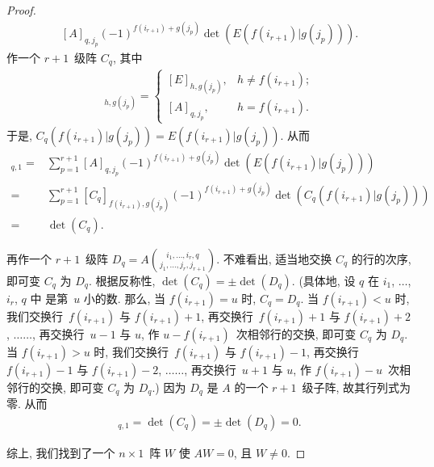 \begin{proof}
\begin{align*}
        {[A]_{q,j_p}
        (-1)^{f(i_{r+1})+g(j_p)}
        \det {(E(f(i_{r+1})|g(j_p)))}}.
    \end{align*}
    作一个 \(r+1\)~级阵 \(C_q\), 其中
    \begin{align*}
        [C_q]_{h,g(j_p)}
        = \begin{cases}
              [E]_{h,g(j_p)},
               & h \neq f(i_{r+1}); \\
              [A]_{q,j_p},
               & h = f(i_{r+1}).
          \end{cases}
    \end{align*}
    于是, \(C_q(f(i_{r+1})|g(j_p))
    = E(f(i_{r+1})|g(j_p))\).
    从而
    \begin{align*}
        [AW]_{q,1}
        = {} &
        \sum_{p=1}^{r+1}
        {[A]_{q,j_p}
        (-1)^{f(i_{r+1})+g(j_p)}
        \det {(E(f(i_{r+1})|g(j_p)))}}
        \\
        = {} &
        \sum_{p=1}^{r+1}
        {[C_q]_{f(i_{r+1}),g(j_p)}
        (-1)^{f(i_{r+1})+g(j_p)}
        \det {(C_q (f(i_{r+1})|g(j_p)))}}
        \\
        = {} &
        \det {(C_q)}.
    \end{align*}

    再作一个 \(r+1\)~级阵
    \(
    \displaystyle
    D_q =
    A\binom{i_1,\dots,i_r,q}
    {j_1,\dots,j_r,j_{r+1}}
    \).
    不难看出, 适当地交换 \(C_q\) 的行的次序,
    即可变 \(C_q\) 为 \(D_q\).
    根据反称性,
    \(\det {(C_q)} = \pm \det {(D_q)}\).
    (具体地, 设 \(q\) 在
    \(i_1\), \(\dots\), \(i_r\), \(q\) 中%
    是第~\(u\) 小的数.
    那么, 当 \(f(i_{r+1}) = u\) 时, \(C_q = D_q\).
    当 \(f(i_{r+1}) < u\) 时,
    我们交换行~\(f(i_{r+1})\) 与 \(f(i_{r+1})+1\),
    再交换行~\(f(i_{r+1})+1\) 与 \(f(i_{r+1})+2\),
    \(\dots \dots\),
    再交换行~\(u-1\) 与 \(u\),
    作 \(u - f(i_{r+1})\)~次相邻行的交换,
    即可变 \(C_q\) 为 \(D_q\).
    当 \(f(i_{r+1}) > u\) 时,
    我们交换行~\(f(i_{r+1})\) 与 \(f(i_{r+1})-1\),
    再交换行~\(f(i_{r+1})-1\) 与 \(f(i_{r+1})-2\),
    \(\dots \dots\),
    再交换行~\(u+1\) 与 \(u\),
    作 \(f(i_{r+1}) - u\)~次相邻行的交换,
    即可变 \(C_q\) 为 \(D_q\).)
    因为 \(D_q\) 是 \(A\) 的一个 \(r+1\)~级子阵,
    故其行列式为零.
    从而
    \begin{align*}
        [AW]_{q,1}
        = \det {(C_q)}
        = \pm \det {(D_q)}
        = 0.
    \end{align*}

    综上, 我们找到了一个 \(n \times 1\)~阵 \(W\)
    使 \(AW = 0\), 且 \(W \neq 0\).
\end{proof}

